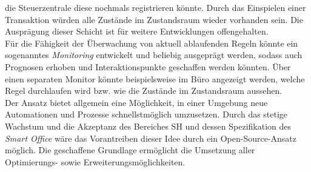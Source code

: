     die Steuerzentrale diese nochmals registrieren könnte. Durch das Einspielen einer Transaktion würden alle Zustände im Zustandsraum wieder vorhanden sein. Die Ausprägung dieser Schicht ist für weitere Entwicklungen offengehalten. 
    \\
    \linebreak
    Für die Fähigkeit der Überwachung von aktuell ablaufenden Regeln könnte ein sogenanntes \textit{Monitoring} entwickelt und beliebig ausgeprägt werden, sodass auch Prognosen erhoben und Interaktionspunkte geschaffen 
    werden könnten. Über einen separaten Monitor könnte beispielsweise im Büro angezeigt werden, welche Regel durchlaufen wird bzw. wie die Zustände im Zustandsraum aussehen. 
    \\
    \linebreak
    Der Ansatz bietet allgemein eine Möglichkeit, in einer Umgebung neue Automationen und Prozesse schnellstmöglich umzusetzen. Durch das stetige Wachstum und die Akzeptanz des Bereiches \acl{SH} und dessen Spezifikation des 
    \textit{Smart Office} wäre das Vorantreiben dieser Idee durch ein Open-Source-Ansatz möglich. Die geschaffene Grundlage ermöglicht die Umsetzung aller Optimierungs- sowie Erweiterungsmöglichkeiten. 

